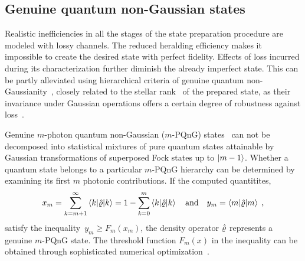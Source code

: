 \documentclass{article}
\begin{document}
%

%
%

\subsection*{Genuine quantum non-Gaussian states}

Realistic inefficiencies in all the stages of the state preparation procedure are modeled with lossy channels. The reduced heralding efficiency makes it impossible to create the desired state with perfect fidelity. Effects of loss incurred during its characterization further diminish the already imperfect state. This can be partly alleviated using hierarchical criteria of genuine quantum non-Gaussianity~\cite{lachman2019}, closely related to the stellar rank~\cite{chabaud2020,walschaers2021,fiurasek2022} of the prepared state, as their invariance under Gaussian operations offers a certain degree of robustness against loss~\cite{lachman2019}.

Genuine $m$-photon quantum non-Gaussian ($m$-PQnG) states~\cite{lachman2019} can not be decomposed into statistical mixtures of pure quantum states attainable by Gaussian transformations of superposed Fock states up to ${\ket{m - 1}}$. Whether a quantum state belongs to a particular $m$-PQnG hierarchy can be determined by examining its first $m$ photonic contributions. 
If the computed quantitites,
%
\begin{equation}
  x_{m} 
    = \sum_{k = m + 1}^{\infty} 
      \braket{k | \hat{\varrho} | k}
    = 1 - \sum_{k = 0}^{m} 
      \braket{k | \hat{\varrho} | k}
  \quad\text{and}\quad
  y_{m} = \braket{m | \hat{\varrho} | m}
  \;\text{,}
\end{equation}
%
satisfy the inequality~${y_{m} \geq F_{m} (x_{m})}$, the density operator $\hat{\varrho}$ represents a genuine $m$-PQnG state. The threshold function $F_{m}(x)$ in the inequality can be obtained through sophisticated numerical optimization~\cite{lachman2019,fiurasek2022}.

%
\end{document}
